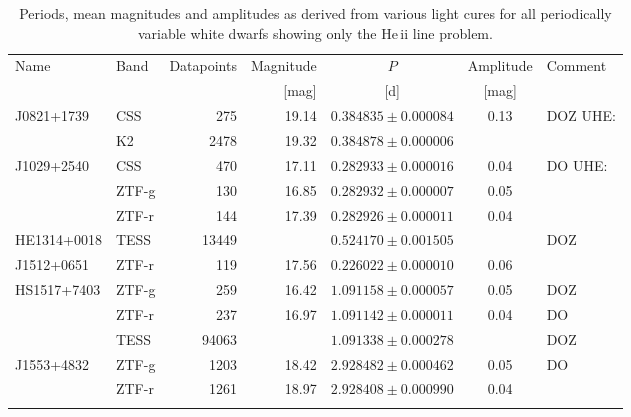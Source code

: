 \documentclass{aa}
\begin{document}
\begin{appendix}
\begin{table}
\caption{Periods, mean magnitudes and amplitudes as derived from various light cures for all periodically variable white dwarfs
  showing only the He\,{\sc ii} line problem.}
\label{tab:periods2}
\begin{tabular}{l l r r c c l}
\hline\hline
\noalign{\smallskip}
Name & Band & Datapoints & Magnitude & $P$ & Amplitude & Comment \\
     &      &            &  [mag]    & [d] & [mag]     &         \\  
\hline
\noalign{\smallskip}
J0821+1739&    CSS        &           275        &           19.14    & $0.384835\pm0.000084$& 0.13 &DOZ UHE:      \\
              &           K2          &      2478           &           19.32    & $0.384878\pm0.000006$& &    \\
\noalign{\smallskip}
J1029+2540 &   CSS        & 470  & 17.11  & $0.282933\pm0.000016$  &  0.04 &DO UHE: \\
               & ZTF-g  & 130  & 16.85  & $0.282932\pm0.000007$  & 0.05 &  \\
               & ZTF-r  & 144  & 17.39  & $0.282926\pm0.000011$  & 0.04 &  \\
\noalign{\smallskip}
HE1314+0018    & TESS  &           13449   &           & $0.524170\pm0.001505$        & & DOZ \\
\noalign{\smallskip}
J1512+0651 & ZTF-r  & 119  & 17.56  & $0.226022\pm0.000010$ & 0.06 &  \\
\noalign{\smallskip}
HS1517+7403 & ZTF-g  & 259  & 16.42  & $1.091158\pm0.000057$ & 0.05 &DOZ  \\
            & ZTF-r  & 237  & 16.97  & $1.091142\pm0.000011$ & 0.04 &DO  \\
            & TESS   & 94063  &      & $1.091338\pm0.000278$ & & DOZ       \\
\noalign{\smallskip}
J1553+4832 & ZTF-g  & 1203 & 18.42  & $2.928482\pm0.000462$  & 0.05 &DO  \\
           & ZTF-r  & 1261 & 18.97  & $2.928408\pm0.000990$  & 0.04 &  \\
\hline
\noalign{\smallskip}
\end{tabular}
\end{table}
 

\end{appendix}
\end{document}
